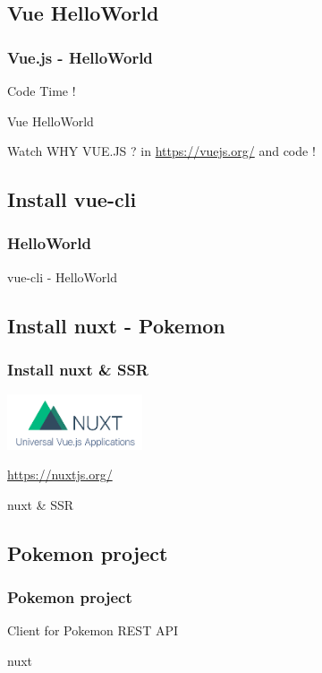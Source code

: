 \documentclass{beamer}
\begin{document}
\subsection{Vue HelloWorld} 
\begin{frame}\frametitle{Vue.js - HelloWorld} 

Code Time !

\begin{block}{Vue HelloWorld}
  \lstvuehelloworld
\end{block}

Watch 		 WHY VUE.JS ? in
\url{https://vuejs.org/}
 and code !
\end{frame}


\subsection{Install vue-cli} 
\begin{frame}\frametitle{HelloWorld} 
 
\begin{block}{vue-cli - HelloWorld}
  \lstinstallvue
\end{block}

\end{frame}


\subsection{Install nuxt - Pokemon} 
\begin{frame}\frametitle{Install nuxt \& SSR} 
\begin{center}
\includegraphics[width=0.3\textwidth]{nuxt.png}
\end{center}

\url{https://nuxtjs.org/}
  
\begin{block}{nuxt \& SSR}
  \lstnuxt
\end{block}

\end{frame}



\subsection{Pokemon project} 
\begin{frame}\frametitle{Pokemon project} 

Client for Pokemon REST API
  
\begin{block}{nuxt}
  \lstpokemon
\end{block}

\end{frame}
\end{document}

